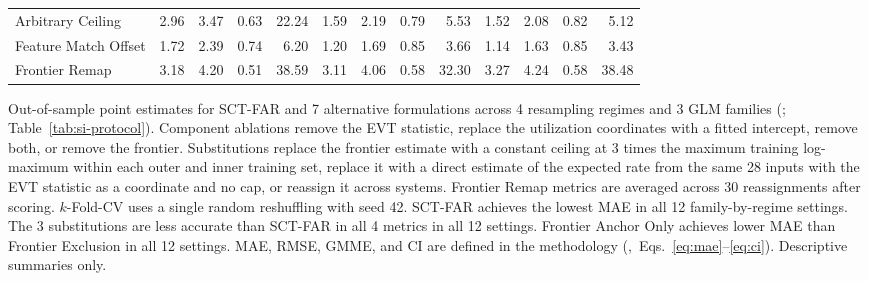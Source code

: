 \documentclass{article}
\begin{document}
\begin{table}[H]
\begin{tabularx}{\linewidth}{@{}>{\raggedright\arraybackslash}Xrrrrrrrrrrrr@{}}
Arbitrary Ceiling & 2.96 & 3.47 & 0.63 & 22.24 & 1.59 & 2.19 & 0.79 & 5.53 & 1.52 & 2.08 & 0.82 & 5.12 \\
Feature Match Offset & 1.72 & 2.39 & 0.74 & 6.20 & 1.20 & 1.69 & 0.85 & 3.66 & 1.14 & 1.63 & 0.85 & 3.43 \\
Frontier Remap & 3.18 & 4.20 & 0.51 & 38.59 & 3.11 & 4.06 & 0.58 & 32.30 & 3.27 & 4.24 & 0.58 & 38.48 \\
\bottomrule
\end{tabularx}
\par\vspace{12pt}
\begin{minipage}{\linewidth}
\footnotesize
Out-of-sample point estimates for SCT-FAR and 7 alternative formulations across 4 resampling regimes and 3 GLM families (; Table~\ref{tab:si-protocol}). Component ablations remove the EVT statistic, replace the utilization coordinates with a fitted intercept, remove both, or remove the frontier. Substitutions replace the frontier estimate with a constant ceiling at 3 times the maximum training log-maximum within each outer and inner training set, replace it with a direct estimate of the expected rate from the same 28 inputs with the EVT statistic as a coordinate and no cap, or reassign it across systems. Frontier Remap metrics are averaged across 30 reassignments after scoring. $k$-Fold-CV uses a single random reshuffling with seed 42. SCT-FAR achieves the lowest MAE in all 12 family-by-regime settings. The 3 substitutions are less accurate than SCT-FAR in all 4 metrics in all 12 settings. Frontier Anchor Only achieves lower MAE than Frontier Exclusion in all 12 settings. MAE, RMSE, GMME, and CI are defined in the methodology (,~Eqs.~\eqref{eq:mae}--\eqref{eq:ci}). Descriptive summaries only.
\end{minipage}
\end{table}
\end{document}
